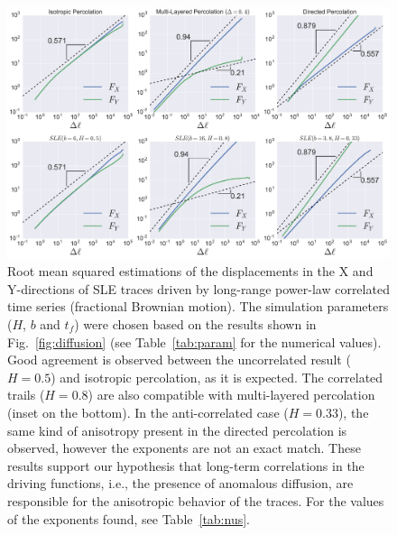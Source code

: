 \begin{figure}
\begin{center}
    \includegraphics[width=\textwidth]{chapters/ch6-asle/figs/spacescaling}
\end{center}
\caption{Root mean squared estimations of the displacements in the X and
    Y-directions of SLE traces driven by long-range power-law correlated time
    series (fractional Brownian motion). The simulation parameters ($H$, $b$
    and $t_f$) were chosen based on the results shown in
    Fig.~\ref{fig:diffusion} (see Table~\ref{tab:param} for the numerical
    values). Good agreement is observed between the uncorrelated result
    ($H=0.5$) and isotropic percolation, as it is expected. The correlated
    trails ($H=0.8$) are also compatible with multi-layered percolation (inset
    on the bottom). In the anti-correlated case ($H=0.33$), the same kind of
    anisotropy present in the directed percolation is observed, however the
    exponents are not an exact match. These results support our hypothesis that
    long-term correlations in the driving functions, i.e., the presence of
    anomalous diffusion, are responsible for the anisotropic behavior of the
    traces. For the values of the exponents found, see Table~\ref{tab:nus}.}
\label{fig:spacescaling}
\end{figure}


